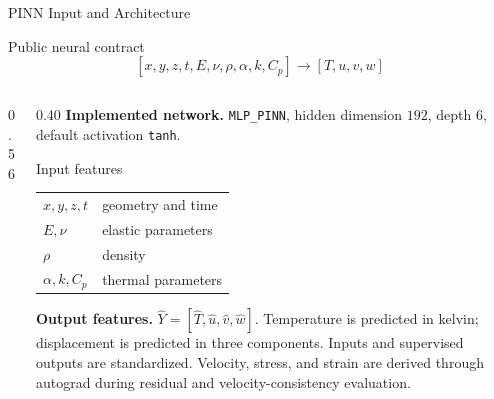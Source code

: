 \documentclass[aspectratio=169,10pt]{beamer}
\begin{document}
\begin{frame}{PINN Input and Architecture}
  \begin{block}{Public neural contract}
    \[
      [x,y,z,t,E,\nu,\rho,\alpha,k,C_p]\rightarrow[T,u,v,w]
    \]
  \end{block}
  \begin{columns}[T]
    \begin{column}{0.56\textwidth}
      \centering
    \end{column}
    \begin{column}{0.40\textwidth}
      {\scriptsize\textbf{Implemented network.} \texttt{MLP\_PINN},
      hidden dimension $192$, depth $6$, default activation \texttt{tanh}.}
      \begin{block}{Input features}
        \scriptsize
        \begin{tabular}{@{}ll@{}}
          $x,y,z,t$ & geometry and time\\
          $E,\nu$ & elastic parameters\\
          $\rho$ & density\\
          $\alpha,k,C_p$ & thermal parameters
        \end{tabular}
      \end{block}
      {\scriptsize\textbf{Output features.}
      $\hat{Y}=[\hat{T},\hat{u},\hat{v},\hat{w}]$.
      Temperature is predicted in kelvin; displacement is predicted in three
      components. Inputs and supervised outputs are standardized. Velocity, stress, and strain are derived through autograd during residual and velocity-consistency evaluation.}
    \end{column}
  \end{columns}
\end{frame}
\end{document}
